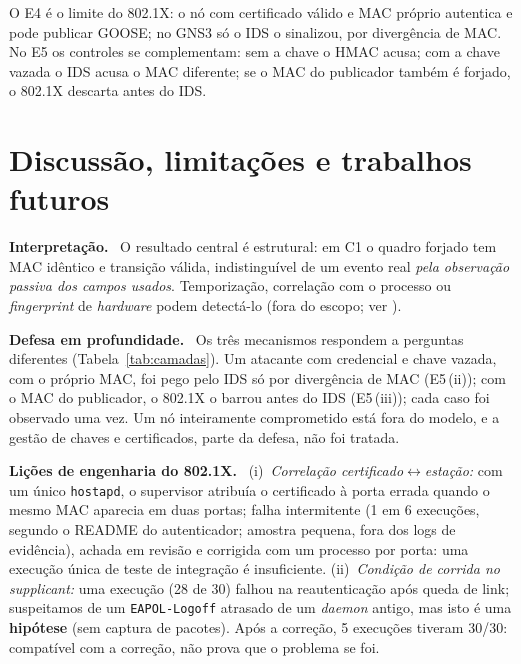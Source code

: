 \documentclass[12pt]{article}
\renewcommand{\paragraph}[1]{\par\noindent\textbf{#1}\ }
\begin{document}
O E4 \'e o limite do 802.1X: o n\'o com certificado v\'alido e MAC pr\'oprio autentica e pode publicar GOOSE; no GNS3 s\'o o IDS o sinalizou, por diverg\^encia de MAC. No E5 os controles se complementam: sem a chave o HMAC acusa; com a chave vazada o IDS acusa o MAC diferente; se o MAC do publicador tamb\'em \'e forjado, o 802.1X descarta antes do IDS.

\section{Discuss\~ao, limita\c{c}\~oes e trabalhos futuros}\label{sec:discussao}

\paragraph{Interpreta\c{c}\~ao.} O resultado central \'e estrutural: em C1 o quadro forjado tem MAC id\^entico e transi\c{c}\~ao v\'alida, indistingu\'ivel de um evento real \emph{pela observa\c{c}\~ao passiva dos campos usados}. Temporiza\c{c}\~ao, correla\c{c}\~ao com o processo ou \emph{fingerprint} de \emph{hardware} podem detect\'a-lo (fora do escopo; ver \cite{moore2026anomaly,alberto2026gooseidrs}).

\paragraph{Defesa em profundidade.} Os tr\^es mecanismos respondem a perguntas diferentes (Tabela~\ref{tab:camadas}). Um atacante com credencial e chave vazada, com o pr\'oprio MAC, foi pego pelo IDS s\'o por diverg\^encia de MAC (E5\,(ii)); com o MAC do publicador, o 802.1X o barrou antes do IDS (E5\,(iii)); cada caso foi observado uma vez. Um n\'o inteiramente comprometido est\'a fora do modelo, e a gest\~ao de chaves e certificados, parte da defesa, n\~ao foi tratada.

\paragraph{Li\c{c}\~oes de engenharia do 802.1X.} (i)~\emph{Correla\c{c}\~ao certificado$\leftrightarrow$esta\c{c}\~ao:} com um \'unico \texttt{hostapd}, o supervisor atribu\'ia o certificado \`a porta errada quando o mesmo MAC aparecia em duas portas; falha intermitente (1 em 6 execu\c{c}\~oes, segundo o README do autenticador; amostra pequena, fora dos logs de evid\^encia), achada em revis\~ao e corrigida com um processo por porta: uma execu\c{c}\~ao \'unica de teste de integra\c{c}\~ao \'e insuficiente. (ii)~\emph{Condi\c{c}\~ao de corrida no supplicant:} uma execu\c{c}\~ao (28 de 30) falhou na reautentica\c{c}\~ao ap\'os queda de link; suspeitamos de um \texttt{EAPOL-Logoff} atrasado de um \emph{daemon} antigo, mas isto \'e uma \textbf{hip\'otese} (sem captura de pacotes). Ap\'os a corre\c{c}\~ao, 5 execu\c{c}\~oes tiveram 30/30: compat\'ivel com a corre\c{c}\~ao, n\~ao prova que o problema se foi.
\end{document}

